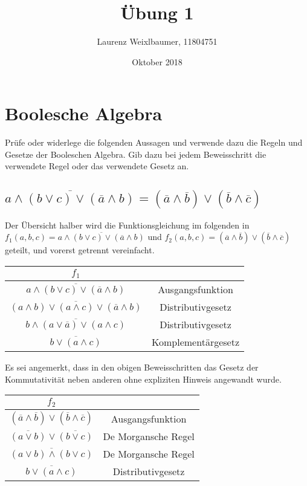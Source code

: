 \documentclass{article}
\title{Übung 1}
\author{Laurenz Weixlbaumer, 11804751}
\date{Oktober 2018}
\begin{document}
\maketitle

\section{Boolesche Algebra}
Prüfe oder widerlege die folgenden Aussagen und verwende dazu die Regeln und
Gesetze der Booleschen Algebra. Gib dazu bei jedem Beweisschritt die verwendete
Regel oder das verwendete Gesetz an.

\subsection{$\overline{a \land (b \lor c) \lor (\overline{a} \land b)} = (\overline{a} \land \overline{b}) \lor (\overline{b} \land \overline{c})$}

Der Übersicht halber wird die Funktionsgleichung im folgenden in $f_1(a, b, c) = \overline{a \land (b \lor c) \lor (\overline{a} \land b)}$ und $f_2(a, b, c) = (\overline{a} \land \overline{b}) \lor (\overline{b} \land \overline{c})$ geteilt, und vorerst getrennt vereinfacht.

\begin{center}
\begin{tabular}{c | c}
    $f_1$\\
    \hline
    $\overline{a \land (b \lor c) \lor (\overline{a} \land b)}$ & Ausgangsfunktion\\
    $\overline{(a \land b) \lor (a \land c) \lor (\overline{a} \land b)}$ & Distributivgesetz\\
    $\overline{b \land (a \lor \overline{a}) \lor (a \land c)}$ & Distributivgesetz\\
    $\overline{b \lor (a \land c)}$ & Komplementärgesetz
\end{tabular}
\end{center}

Es sei angemerkt, dass in den obigen Beweisschritten das Gesetz der Kommutativität neben anderen ohne expliziten Hinweis angewandt wurde.

\begin{center}
\begin{tabular}{c | c}
    $f_2$\\
    \hline
    $(\overline{a} \land \overline{b}) \lor (\overline{b} \land \overline{c})$ & Ausgangsfunktion\\
    $\overline{(a \lor b)} \lor \overline{(b \lor c)}$ & De Morgansche Regel\\
    $\overline{(a \lor b) \land (b \lor c)}$ & De Morgansche Regel\\
    $\overline{b \lor (a \land c)}$ & Distributivgesetz
\end{tabular}
\end{center}
\end{document}

